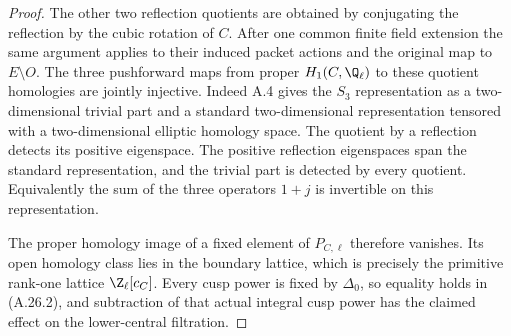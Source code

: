 \begin{proof}
The other two reflection quotients are obtained
by conjugating the reflection by the cubic
rotation of $C$. After one common finite field
extension the same argument applies to their
induced packet actions and the original map
to $E\setminus O$.
The three pushforward maps from proper
$H_1(C,\Q_\ell)$ to these quotient homologies
are jointly injective. Indeed A.4 gives the
$S_3$ representation as a two-dimensional
trivial part and a standard two-dimensional
representation tensored with a two-dimensional
elliptic homology space. The quotient by a
reflection detects its positive eigenspace.
The positive reflection eigenspaces span the
standard representation, and the trivial part
is detected by every quotient. Equivalently
the sum of the three operators $1+j$ is
invertible on this representation.

The proper homology image of a fixed element
of $P_{C,\ell}$ therefore vanishes. Its open
homology class lies in the boundary lattice,
which is precisely the primitive rank-one
lattice $\Z_\ell[c_C]$. Every cusp power is
fixed by $\Delta_0$, so equality holds in
(A.26.2), and subtraction of that actual
integral cusp power has the claimed effect
on the lower-central filtration.
\end{proof}
